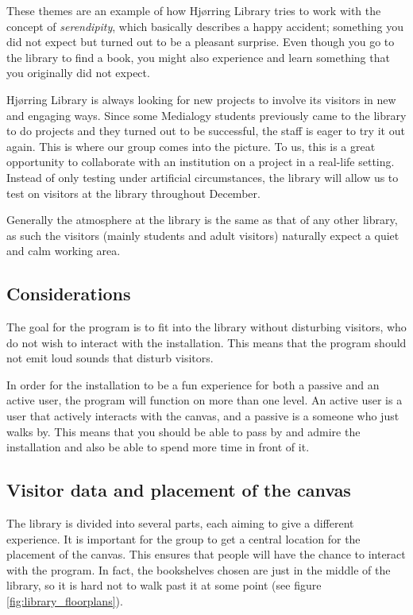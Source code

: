 These themes are an example of how Hj{\o}rring Library tries to work with the concept of \textit{serendipity}, which basically describes a happy accident; something you did not expect but turned out to be a pleasant surprise. Even though you go to the library to find a book, you might also experience and learn something that you originally did not expect.

Hj{\o}rring Library is always looking for new projects to involve its visitors in new and engaging ways. Since some Medialogy students previously came to the library to do projects and they turned out to be successful, the staff is eager to try it out again. This is where our group comes into the picture. To us, this is a great opportunity to collaborate with an institution on a project in a real-life setting. Instead of only testing under artificial circumstances, the library will allow us to test on visitors at the library throughout December.

Generally the atmosphere at the library is the same as that of any other library, as such the visitors (mainly students and adult visitors) naturally expect a quiet and calm working area.

\subsection{Considerations}
The goal for the program is to fit into the library without disturbing visitors, who do not wish to interact with the installation. This means that the program should not emit loud sounds that disturb visitors.

In order for the installation to be a fun experience for both a passive and an active user, the program will function on more than one level. An active user is a user that actively interacts with the canvas, and a passive is a someone who just walks by. This means that you should be able to pass by and admire the installation and also be able to spend more time in front of it.

\subsection{Visitor data and placement of the canvas}
The library is divided into several parts, each aiming to give a different experience. It is important for the group to get a central location for the placement of the canvas. This ensures that people will have the chance to interact with the program. In fact, the bookshelves chosen are just in the middle of the library, so it is hard not to walk past it at some point (see figure \ref{fig:library_floorplans}).


